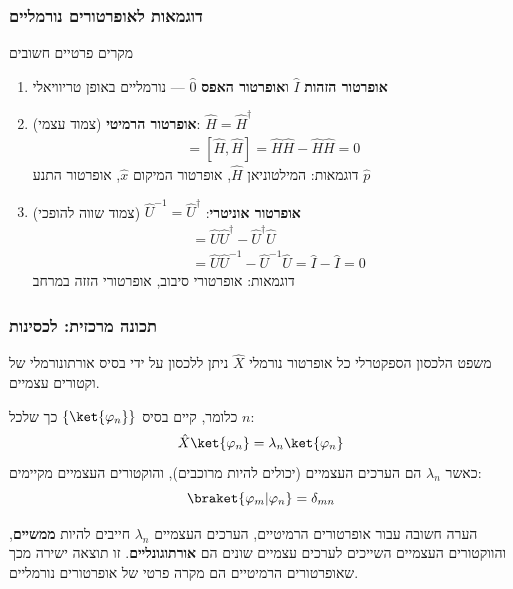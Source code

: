 \subsubsection*{דוגמאות לאופרטורים נורמליים}

\begin{examplebox}{מקרים פרטיים חשובים}
\begin{enumerate}
    \item \textbf{אופרטור הזהות} $\hat{I}$ ו\textbf{אופרטור האפס} $\hat{0}$ — נורמליים באופן טריוויאלי
    
    \item \textbf{אופרטור הרמיטי} (צמוד עצמי): $\hat{H} = \hat{H}^\dagger$
    \begin{align*}
    [\hat{H},\hat{H}^\dagger] = [\hat{H},\hat{H}] = \hat{H}\hat{H} - \hat{H}\hat{H} = 0
    \end{align*}
    דוגמאות: המילטוניאן $\hat{H}$, אופרטור המיקום $\hat{x}$, אופרטור התנע $\hat{p}$
    
    \item \textbf{אופרטור אוניטרי}: $\hat{U}^{-1} = \hat{U}^\dagger$ (צמוד שווה להופכי)
    \begin{align*}
    [\hat{U},\hat{U}^\dagger] &= \hat{U}\hat{U}^\dagger - \hat{U}^\dagger\hat{U} \\
    &= \hat{U}\hat{U}^{-1} - \hat{U}^{-1}\hat{U} = \hat{I} - \hat{I} = 0
    \end{align*}
    דוגמאות: אופרטורי סיבוב, אופרטורי הזזה במרחב
\end{enumerate}
\end{examplebox}

\subsubsection*{תכונה מרכזית: לכסינות}

\begin{theorembox}{משפט הלכסון הספקטרלי}
כל אופרטור נורמלי $\hat{X}$ ניתן ללכסון על ידי בסיס אורתונורמלי של וקטורים עצמיים.

כלומר, קיים בסיס $\{\ket{\varphi_n}\}$ כך שלכל $n$:
\[
\hat{X}\ket{\varphi_n}=\lambda_n\ket{\varphi_n}
\]
כאשר $\lambda_n$ הם הערכים העצמיים (יכולים להיות מרוכבים), והוקטורים העצמיים מקיימים:
\[
\braket{\varphi_m|\varphi_n} = \delta_{mn}
\]
\end{theorembox}

\begin{notebox}{הערה חשובה}
עבור אופרטורים הרמיטיים, הערכים העצמיים $\lambda_n$ חייבים להיות \textbf{ממשיים}, והווקטורים העצמיים השייכים לערכים עצמיים שונים הם \textbf{אורתוגונליים}. זו תוצאה ישירה מכך שאופרטורים הרמיטיים הם מקרה פרטי של אופרטורים נורמליים.
\end{notebox}

